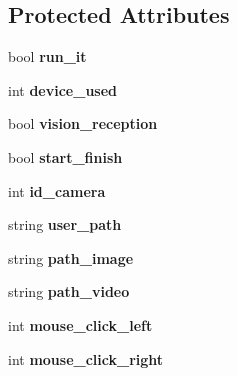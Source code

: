 \subsection*{Protected Attributes}
\begin{DoxyCompactItemize}
\item 
bool {\bfseries run\+\_\+it}\hypertarget{classcalibration_a3b4703e9670b0c80359bae2747878245}{}\label{classcalibration_a3b4703e9670b0c80359bae2747878245}

\item 
int {\bfseries device\+\_\+used}\hypertarget{classcalibration_a5f6ca76dc8c0fbf33f1c6a604b72cdc0}{}\label{classcalibration_a5f6ca76dc8c0fbf33f1c6a604b72cdc0}

\item 
bool {\bfseries vision\+\_\+reception}\hypertarget{classcalibration_a9606829157d28f46f87febceb67ba14c}{}\label{classcalibration_a9606829157d28f46f87febceb67ba14c}

\item 
bool {\bfseries start\+\_\+finish}\hypertarget{classcalibration_aa3b093eb7694fdcb78408efdeb331e01}{}\label{classcalibration_aa3b093eb7694fdcb78408efdeb331e01}

\item 
int {\bfseries id\+\_\+camera}\hypertarget{classcalibration_abb71e83b1caac73be1f8a5ec9ff85f5f}{}\label{classcalibration_abb71e83b1caac73be1f8a5ec9ff85f5f}

\item 
string {\bfseries user\+\_\+path}\hypertarget{classcalibration_a5e02265737a63f54063be406ab043a9e}{}\label{classcalibration_a5e02265737a63f54063be406ab043a9e}

\item 
string {\bfseries path\+\_\+image}\hypertarget{classcalibration_ab5b38c34686e2d0ef790f5ea1bf022d2}{}\label{classcalibration_ab5b38c34686e2d0ef790f5ea1bf022d2}

\item 
string {\bfseries path\+\_\+video}\hypertarget{classcalibration_ac3b22d58acc42fb7c8217518f6ea4846}{}\label{classcalibration_ac3b22d58acc42fb7c8217518f6ea4846}

\item 
int {\bfseries mouse\+\_\+click\+\_\+left}\hypertarget{classcalibration_ada27036ba780db458e9dc14f13f0809a}{}\label{classcalibration_ada27036ba780db458e9dc14f13f0809a}

\item 
int {\bfseries mouse\+\_\+click\+\_\+right}\hypertarget{classcalibration_a40702565952927ef98184ddeb27d5581}{}\label{classcalibration_a40702565952927ef98184ddeb27d5581}


\end{DoxyCompactItemize}
